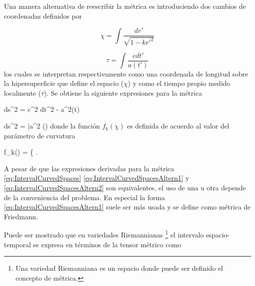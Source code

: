 Una manera alternativa de reescribir la métrica es introduciendo dos cambios 
de coordenadas definidos por 


\[ \chi = \int \frac{ dr'}{\sqrt{1 - k r'^2}}\]


\[ \tau = \int \frac{ c dt'}{a(t')}\]
los cuales se interpretan respectivamente como una coordenada de longitud 
sobre la hipersuperficie que define el espacio ($\chi$) y como el tiempo 
propio medido localmente ($\tau$). Se obtiene la siguiente expresiones para 
la métrica


{ ds^2 = c^2 dt^2 - a^2(t)  }


{ ds^2 = \bar a^2 (\tau) }
donde la función $f_k(\chi)$ es definida de acuerdo al valor del parámetro 
de curvatura


{ f_k(\chi) = \left\{   \right.  }


A pesar de que las expresiones derivadas para la métrica 
\ref{eq:IntervalCurvedSpaces} \ref{eq:IntervalCurvedSpacesAltern1} y
\ref{eq:IntervalCurvedSpacesAltern2} son equivalentes, el uso de una u otra
depende de la conveniencia del problema. En especial la forma 
\ref{eq:IntervalCurvedSpacesAltern1} suele ser más usada y se define como 
métrica de Friedmann.


Puede ser mostrado que en variedades Riemannianas 
\footnote{Una variedad Riemanniana es un espacio donde puede ser definido el 
concepto de métrica.} 
el intervalo espacio-temporal se expresa en términos de la tensor métrico
como \cite{weinberg1972}


